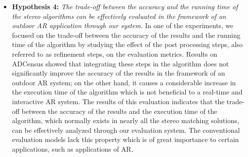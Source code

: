 \begin{itemize}
\item \textbf{Hypothesis 4:} \emph{The trade-off between the accuracy and the running time of the stereo algorithms can be effectively evaluated 
in the framework of an outdoor AR application through our system.} 
In one of the experiments, we focused on the trade-off between the accuracy of the results and the running time of the algorithm by studying the effect
of the post processing steps, also referred to as refinement steps, on the evaluation metrics. Results on ADCensus showed that integrating these steps in the algorithm
does not significantly improve the accuracy of the results in the framework of an outdoor AR system; on the other hand, it causes a considerable increase in the execution
time of the algorithm which is not beneficial to a real-time and interactive AR system. The results of this evaluation indicates that the trade-off between the accuracy 
of the results and the execution time of the algorithm, which normally exists in nearly all the stereo matching solutions, can be effectively analyzed 
through our evaluation system. The conventional evaluation models lack this property which is of great importance to certain applications, such as applications of AR.

\end{itemize}



